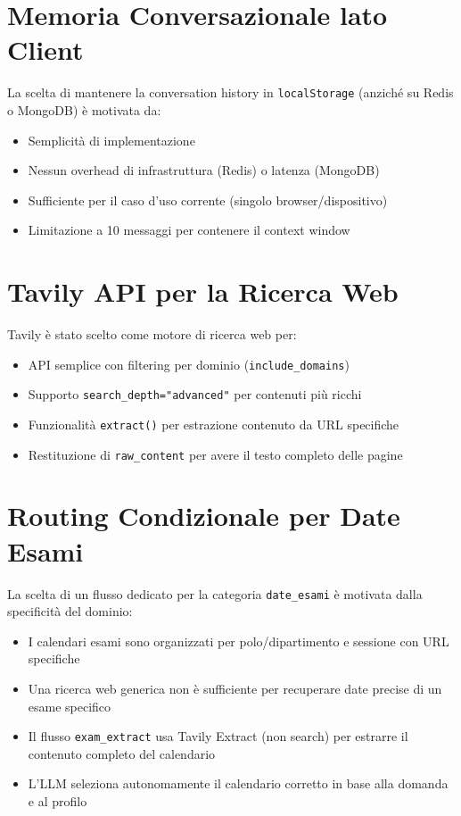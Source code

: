 \documentclass[a4paper,12pt]{report}
\begin{document}
\section{Memoria Conversazionale lato Client}

La scelta di mantenere la conversation history in \texttt{localStorage} (anziché su Redis o MongoDB) è motivata da:
\begin{itemize}
    \item Semplicità di implementazione
    \item Nessun overhead di infrastruttura (Redis) o latenza (MongoDB)
    \item Sufficiente per il caso d'uso corrente (singolo browser/dispositivo)
    \item Limitazione a 10 messaggi per contenere il context window
\end{itemize}

\section{Tavily API per la Ricerca Web}

Tavily è stato scelto come motore di ricerca web per:
\begin{itemize}
    \item API semplice con filtering per dominio (\texttt{include\_domains})
    \item Supporto \texttt{search\_depth="advanced"} per contenuti più ricchi
    \item Funzionalità \texttt{extract()} per estrazione contenuto da URL specifiche
    \item Restituzione di \texttt{raw\_content} per avere il testo completo delle pagine
\end{itemize}

\section{Routing Condizionale per Date Esami}

La scelta di un flusso dedicato per la categoria \texttt{date\_esami} è motivata dalla specificità del dominio:
\begin{itemize}
    \item I calendari esami sono organizzati per polo/dipartimento e sessione con URL specifiche
    \item Una ricerca web generica non è sufficiente per recuperare date precise di un esame specifico
    \item Il flusso \texttt{exam\_extract} usa Tavily Extract (non search) per estrarre il contenuto completo del calendario
    \item L'LLM seleziona autonomamente il calendario corretto in base alla domanda e al profilo
\end{itemize}
\end{document}
